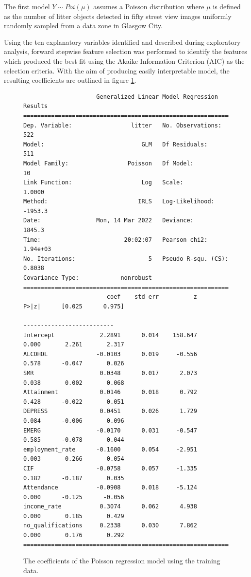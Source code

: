 \documentclass{thesis}
\begin{document}
The first model $Y \sim Poi(\mu)$ assumes a Poisson distribution where $\mu$ is defined as the number of litter objects detected in fifty street view images uniformly randomly sampled from a data zone in Glasgow City.

Using the ten explanatory variables identified and described during exploratory analysis, forward stepwise feature selection was performed to identify the features which produced the best fit using the Akaike Information Criterion (AIC) as the selection criteria. With the aim of producing easily interpretable model, the resulting coefficients are outlined in figure \ref{fig:pos-coeff}.

\begin{figure}[h!]
    \centering
\footnotesize
\begin{verbatim}
                     Generalized Linear Model Regression Results                  
==============================================================================
Dep. Variable:                 litter   No. Observations:                  522
Model:                            GLM   Df Residuals:                      511
Model Family:                 Poisson   Df Model:                           10
Link Function:                    Log   Scale:                          1.0000
Method:                          IRLS   Log-Likelihood:                -1953.3
Date:                Mon, 14 Mar 2022   Deviance:                       1845.3
Time:                        20:02:07   Pearson chi2:                 1.94e+03
No. Iterations:                     5   Pseudo R-squ. (CS):             0.8038
Covariance Type:            nonrobust                                         
=====================================================================================
                        coef    std err          z      P>|z|      [0.025      0.975]
-------------------------------------------------------------------------------------
Intercept             2.2891      0.014    158.647      0.000       2.261       2.317
ALCOHOL              -0.0103      0.019     -0.556      0.578      -0.047       0.026
SMR                   0.0348      0.017      2.073      0.038       0.002       0.068
Attainment            0.0146      0.018      0.792      0.428      -0.022       0.051
DEPRESS               0.0451      0.026      1.729      0.084      -0.006       0.096
EMERG                -0.0170      0.031     -0.547      0.585      -0.078       0.044
employment_rate      -0.1600      0.054     -2.951      0.003      -0.266      -0.054
CIF                  -0.0758      0.057     -1.335      0.182      -0.187       0.035
Attendance           -0.0908      0.018     -5.124      0.000      -0.125      -0.056
income_rate           0.3074      0.062      4.938      0.000       0.185       0.429
no_qualifications     0.2338      0.030      7.862      0.000       0.176       0.292
=====================================================================================
\end{verbatim}
\normalsize
    \caption{The coefficients of the Poisson regression model using the training data.}
    \label{fig:pos-coeff}
\end{figure}
\end{document}
